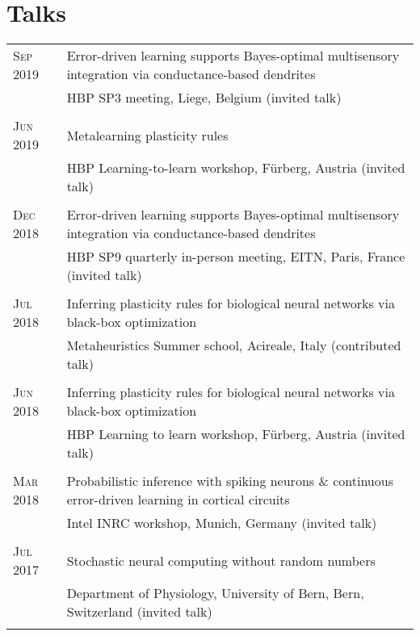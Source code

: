 \section{Talks}
\begin{longtable}{>{\hfill}p{3.3cm}|p{12.0cm}}
  \textsc{Sep} 2019 & Error-driven learning supports Bayes-optimal multisensory integration via conductance-based dendrites \\
  & \footnotesize HBP SP3 meeting, Liege, Belgium (invited talk) \\
  \multicolumn{2}{c}{} \\
  \textsc{Jun} 2019 & Metalearning plasticity rules \\
  & \footnotesize HBP Learning-to-learn workshop, F\"urberg, Austria (invited talk) \\
  \multicolumn{2}{c}{} \\
  \textsc{Dec} 2018 & Error-driven learning supports Bayes-optimal multisensory integration via conductance-based dendrites \\
  & \footnotesize HBP SP9 quarterly in-person meeting, EITN, Paris, France (invited talk) \\
  \multicolumn{2}{c}{} \\
  \textsc{Jul} 2018 & Inferring plasticity rules for biological neural networks via black-box optimization \\
  & \footnotesize Metaheuristics Summer school, Acireale, Italy (contributed talk) \\
  \multicolumn{2}{c}{} \\
  \textsc{Jun} 2018 & Inferring plasticity rules for biological neural networks via black-box optimization \\
  & \footnotesize HBP Learning to learn workshop, F\"urberg, Austria (invited talk) \\
  \multicolumn{2}{c}{} \\
  \textsc{Mar} 2018 & Probabilistic inference with spiking neurons \& continuous error-driven learning in cortical circuits \\
  & \footnotesize Intel INRC workshop, Munich, Germany (invited talk) \\
  \multicolumn{2}{c}{} \\
  \textsc{Jul} 2017 & Stochastic neural computing without random numbers \\
  & \footnotesize Department of Physiology, University of Bern, Bern, Switzerland (invited talk) \\
  \multicolumn{2}{c}{} \\

\end{longtable}
